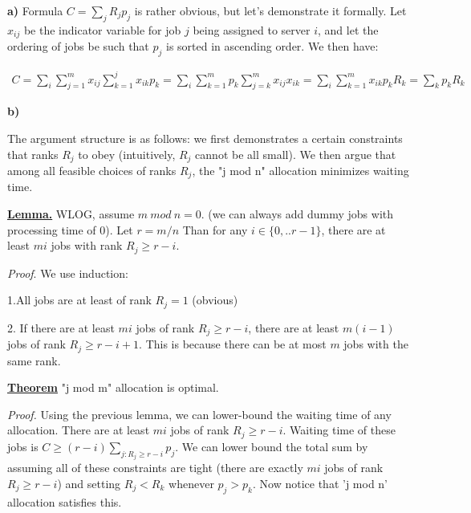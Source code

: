 
\textbf{a)} Formula $C=\sum_j R_j p_j$ is rather obvious, but let's demonstrate it formally. Let $x_{ij}$ be the indicator variable for job $j$ being assigned to server $i$, and let the ordering of jobs be such that $p_j$ is sorted in ascending order. We then have:

\begin{align*}
C = \sum_i \sum_{j=1}^m x_{ij}\sum_{k=1}^j x_{ik}p_k = \sum_i \sum_{k=1}^m p_k \sum_{j=k}^m x_{ij}x_{ik} = \sum_i \sum_{k=1}^m x_{ik} p_k R_k = \sum_k p_k R_k
\end{align*}

\textbf{b)}

The argument structure is as follows: we first demonstrates a certain constraints that ranks $R_j$ to obey (intuitively, $R_j$ cannot be all small). We then argue that among all feasible choices of ranks $R_j$, the "j mod n" allocation minimizes waiting time.

\uline{\textbf{Lemma.}} WLOG, assume $m\ mod\ n =0$. (we can always add dummy jobs with processing time of 0). Let $r=m/n$ Than for any $i\in \{0,..r -1\}$, there are at least $mi$ jobs with rank $R_j\geq r - i$.

\textit{Proof}.  We use induction:

1.All jobs are at least of rank $R_j=1$ (obvious)

2. If there are at least $mi$ jobs of rank $R_j\geq r-i$, there are at least $m(i-1)$ jobs of rank $R_j\geq r-i+1$. This is because there can be at most $m$ jobs with the same rank.

\uline{\textbf{Theorem}} "j mod m" allocation is optimal.

\textit{Proof.} Using the previous lemma, we can lower-bound the waiting time of any allocation. There are at least $mi$ jobs of rank $R_j\geq r-i$. Waiting time of these jobs is $C \geq (r-i)\sum_{j: R_j\geq r-i} p_j$. We can lower bound the total sum by assuming all of these constraints are tight (there are exactly $mi$ jobs of rank $R_j\geq r-i$) and setting $R_j<R_k$ whenever $p_j> p_k$. Now notice that 'j mod n' allocation satisfies this.
%
%
%
%
%
%



